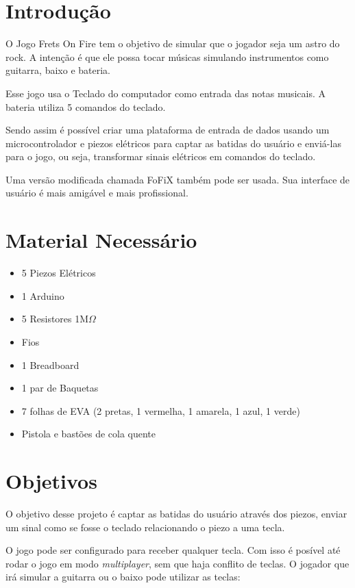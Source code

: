 \section{Introdução}\label{introduuxe7uxe3o}

O Jogo Frets On Fire \cite{fretsonfire-2006} tem o objetivo de simular
que o jogador seja um astro do rock. A intenção é que ele possa tocar
músicas simulando instrumentos como guitarra, baixo e bateria.

Esse jogo usa o Teclado do computador como entrada das notas musicais. A
bateria utiliza 5 comandos do teclado.

Sendo assim é possível criar uma plataforma de entrada de dados usando
um microcontrolador e piezos elétricos para captar as batidas do usuário
e enviá-las para o jogo, ou seja, transformar sinais elétricos em
comandos do teclado.

Uma versão modificada chamada FoFiX \cite{fofix-2006} também pode ser
usada. Sua interface de usuário é mais amigável e mais profissional.

\section{Material Necessário}\label{material-necessuxe1rio}

\begin{itemize}
\itemsep1pt\parskip0pt
\item
  5 Piezos Elétricos
\item
  1 Arduino
\item
  5 Resistores 1M$\Omega$
\item
  Fios
\item
  1 Breadboard
\item
  1 par de Baquetas
\item
  7 folhas de EVA (2 pretas, 1 vermelha, 1 amarela, 1 azul, 1 verde)
\item
  Pistola e bastões de cola quente
\end{itemize}

\section{Objetivos}\label{objetivos}

O objetivo desse projeto é captar as batidas do usuário através dos
piezos, enviar um sinal como se fosse o teclado relacionando o piezo a
uma tecla.

O jogo pode ser configurado para receber qualquer tecla. Com isso é
posível até rodar o jogo em modo \emph{multiplayer}, sem que haja
conflito de teclas. O jogador que irá simular a guitarra ou o baixo pode
utilizar as teclas:

